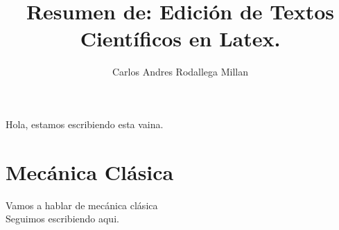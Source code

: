 \documentclass[10pt,letterpaper]{book}
\author{Carlos Andres Rodallega Millan}
\title{Resumen de: Edición de Textos Científicos en Latex.}
\begin{document}
\maketitle
\makeindex
Hola, estamos escribiendo esta vaina.
\chapter{Mecánica Clásica}
Vamos a hablar de mecánica clásica\\
\newpage
Seguimos escribiendo aqui.
\end{document}
